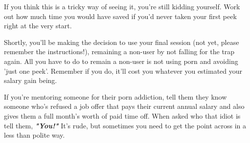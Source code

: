 \documentclass[easypeasy.tex]{subfiles}
\begin{document}
If you think this is a tricky way of seeing it, you're still kidding yourself. Work out how much time you would have saved if you'd never taken your first peek right at the very start.

Shortly, you'll be making the decision to use your final session (not yet, please remember the instructions!), remaining a non-user by not falling for the trap again. All you have to do to remain a non-user is not using porn and avoiding 'just one peek'. Remember if you do, it'll cost you whatever you estimated your salary gain being.

If you're mentoring someone for their porn addiction, tell them they know someone who's refused a job offer that pays their current annual salary and also gives them a full month's worth of paid time off. When asked who that idiot is tell them, \textbf{\textit{"You!"}} It's rude, but sometimes you need to get the point across in a less than polite way.
\end{document}
